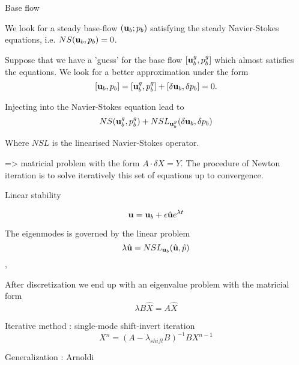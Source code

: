 \documentclass{beamer}
\newcommand{\be}[1]{ \begin{equation} \label{#1}}
\newcommand{\ee}{\end{equation}}
\newcommand{\ssp}{\vspace{.2cm} }
\begin{document}
\begin{frame}{Base flow}

We look for a steady base-flow $({\bf u}_b;p_b)$ satisfying the steady Navier-Stokes equations, i.e. 
$NS ({\bf u}_b,p_b) = 0$.


Suppose that we have a 'guess' for the base flow $[{\bf u}_b^g,p_b^g]$  which almost satisfies the equations.  We look for a better approximation under the form
\be{Newton1}
[{\bf u}_b,p_b]  = [{\bf u}_b^g,p_b^g] + [\delta {\bf u}_b, \delta p_b] = 0.
\ee

Injecting into the Navier-Stokes equation lead to $$
NS ({\bf u}_b^g,p_b^g) + NSL_{{\bf u}_b^g}(\delta {\bf u}_b,\delta p_b)$$


Where $NSL$ is the linearised Navier-Stokes operator. 



=>  matricial problem with the form $A \cdot \delta X = Y$. The procedure of Newton iteration is to solve iteratively this set of equations up to convergence.

\end{frame}





\begin{frame}{Linear stability}

\be{startmodepropre}
{\bf u} = {\bf u}_b + \epsilon \hat{\bf u} e^{\lambda t} 
\ee

The eigenmodes is governed by the linear problem 
$$\lambda \hat{{\bf u}} = NSL_{{\bf u}_b}( \hat{\bf u},\hat{p})$$,

After discretization we end up with an eigenvalue problem with the matricial form
\be{Eigen_matricial}
\lambda B \hat{X} = A \hat{X}
\ee

\ssp
Iterative method : single-mode shift-invert iteration
$$
X^{n} =  (A- \lambda_{shift} B)^{-1} B X^{n-1}
$$ 

Generalization : Arnoldi

\end{frame}


\end{document}

